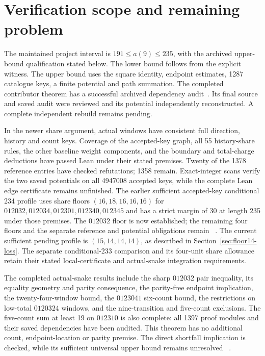 \documentclass[11pt,a4paper]{article}
\theoremstyle{definition}
\theoremstyle{remark}
\begin{document}
\section{Verification scope and remaining problem}\label{sec:verification}
The maintained project interval is $191\le a(9)\le235$, with the archived
upper-bound qualification stated below. The lower bound follows
from the explicit witness. The upper bound uses the square identity,
endpoint estimates, 1287 catalogue keys, a finite potential and path
summation. The completed contributor theorem has a successful archived
dependency audit~\cite{bound235archive}. Its final source and saved audit were
reviewed and its potential independently reconstructed. A complete
independent rebuild remains pending.

In the newer share argument, actual windows have consistent full direction,
history and count keys. Coverage of the accepted-key graph, all 55
history-share rules, the other baseline weight components, and the boundary
and total-charge deductions have passed Lean under their stated premises.
Twenty of the 1378 reference entries have checked refutations; 1358 remain.
Exact-integer scans verify the two saved potentials on all 4947008 accepted
keys, while the complete Lean edge certificate remains unfinished.
The earlier sufficient accepted-key conditional 234 profile uses share floors
$(16,18,16,16,16)$ for $012032,012034,012301,012340,012345$ and has a
strict margin of 30 at length 235 under those premises. The $012032$
floor is now established; the remaining four floors and the separate
reference and potential obligations remain
~\cite{referenceunionarchive,potentialcertificatearchive,share152archive}.
The current sufficient pending profile is $(15,14,14,14)$, as described in
Section~\ref{sec:floor14-loss}. The separate conditional-233 comparison
and its four-unit share allowance retain their stated local-certificate
and actual-snake integration requirements.

The completed actual-snake results include the sharp $012032$ pair
inequality, its equality geometry and parity consequence, the parity-free
endpoint implication, the twenty-four-window bound, the $0123041$
six-count bound, the restrictions on low-total $0120324$ windows, and the
nine-transition and five-count exclusions. The five-count sum at least 19
on $012310$ is also complete: all 1397 proof modules and their saved
dependencies have been audited. This theorem has no additional count,
endpoint-location or parity premise. The direct shortfall implication is
checked, while its sufficient universal upper bound remains unresolved
~\cite{count24archive,fivecount140archive,share145archive}.
\end{document}

